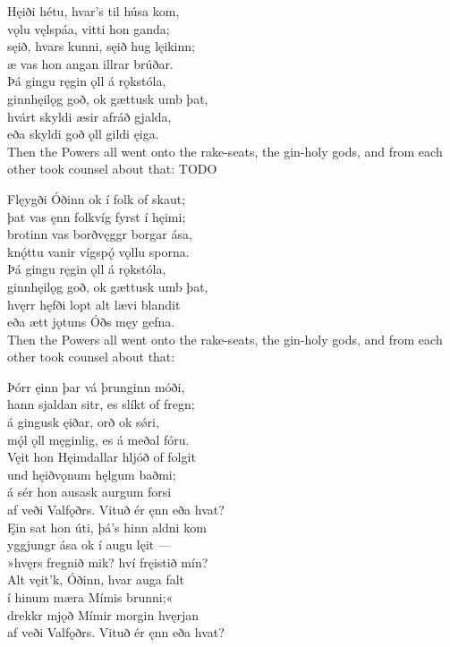 \bva Hęiði hétu, \hld hvar's til húsa kom, \\%
vǫlu vęlspáa, \hld vitti hon ganda; \\%
sęið, hvars kunni, \hld sęið hug lęikinn; \\%
æ vas hon angan \hld illrar brúðar.\\%

\bva Þá gingu ręgin ǫll \hld á rǫkstóla, \\%
ginnhęilǫg goð, \hld ok gættusk umb þat, \\%
hvárt skyldi æsir \hld afráð gjalda, \\%
eða skyldi goð ǫll \hld gildi ęiga.\\%

\bvb Then the Powers all went onto the rake-seats, the gin-holy gods, and from each other took counsel about that: TODO

\bva Flęygði Óðinn \hld ok í folk of skaut; \\%
þat vas ęnn folkvíg \hld fyrst í hęimi; \\%
brotinn vas borðvęggr \hld borgar ása, \\%
knǫ́ttu vanir vígspǫ́ \hld vǫllu sporna.\\%

\bva Þá gingu ręgin ǫll \hld á rǫkstóla, \\%
ginnhęilǫg goð, \hld ok gættusk umb þat, \\%
hvęrr hęfði lopt alt \hld lævi blandit \\%
eða ætt jǫtuns \hld Óðs męy gefna.\\%

\bvb Then the Powers all went onto the rake-seats, the gin-holy gods, and from each other took counsel about that:

\bva Þórr ęinn þar vá \hld þrunginn móði, \\%
hann sjaldan sitr, \hld es slíkt of fregn; \\%
á gingusk ęiðar, \hld orð ok sǿri, \\%
mǫ́l ǫll męginlig, \hld es á meðal fóru.\\%

\bva Vęit hon Hęimdallar \hld hljóð of folgit \\%
und hęiðvǫnum \hld hęlgum baðmi; \\%
á sér hon ausask \hld aurgum forsi \\%
af veði Valfǫðrs. \hld Vituð ér ęnn eða hvat?\\%

\bva Ęin sat hon úti, \hld þá's hinn aldni kom \\%
yggjungr ása \hld ok í augu lęit — \\%
»hvęrs fregnið mik? \hld hví fręistið mín? \\%
Alt vęit'k, Óðinn, \hld hvar auga falt \\%
í hinum mæra \hld Mímis brunni;« \\%
drekkr mjǫð Mímir \hld morgin hvęrjan \\%
af veði Valfǫðrs. \hld Vituð ér ęnn eða hvat?\\%

